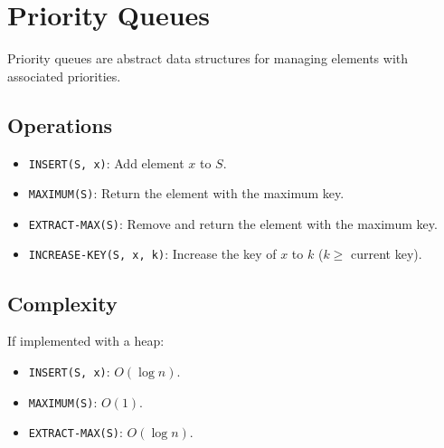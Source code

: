 \section{Priority Queues}
Priority queues are abstract data structures for managing elements with associated priorities.

\subsection{Operations}
\begin{itemize}
    \item \texttt{INSERT(S, x)}: Add element \( x \) to \( S \).
    \item \texttt{MAXIMUM(S)}: Return the element with the maximum key.
    \item \texttt{EXTRACT-MAX(S)}: Remove and return the element with the maximum key.
    \item \texttt{INCREASE-KEY(S, x, k)}: Increase the key of \( x \) to \( k \) (\( k \geq \) current key).
\end{itemize}

\subsection{Complexity}
If implemented with a heap:
\begin{itemize}
    \item \texttt{INSERT(S, x)}: \( O(\log n) \).
    \item \texttt{MAXIMUM(S)}: \( O(1) \).
    \item \texttt{EXTRACT-MAX(S)}: \( O(\log n) \).
\end{itemize}
